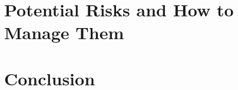 \documentclass{article}
\begin{document}

\section{Potential Risks and How to Manage Them}



\section{Conclusion}



\end{document}
